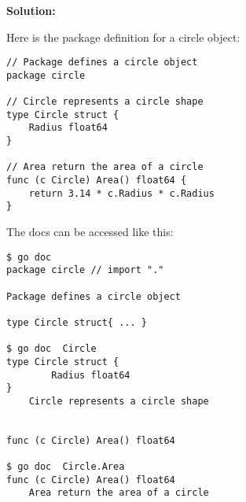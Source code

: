\textbf{Solution:}

Here is the package definition for a circle object:

\begin{lstlisting}[numbers=none]
// Package defines a circle object
package circle

// Circle represents a circle shape
type Circle struct {
    Radius float64
}

// Area return the area of a circle
func (c Circle) Area() float64 {
    return 3.14 * c.Radius * c.Radius
}
\end{lstlisting}

The docs can be accessed like this:

\begin{lstlisting}[numbers=none]
$ go doc
package circle // import "."

Package defines a circle object

type Circle struct{ ... }

$ go doc  Circle
type Circle struct {
        Radius float64
}
    Circle represents a circle shape


func (c Circle) Area() float64

$ go doc  Circle.Area
func (c Circle) Area() float64
    Area return the area of a circle
\end{lstlisting}
